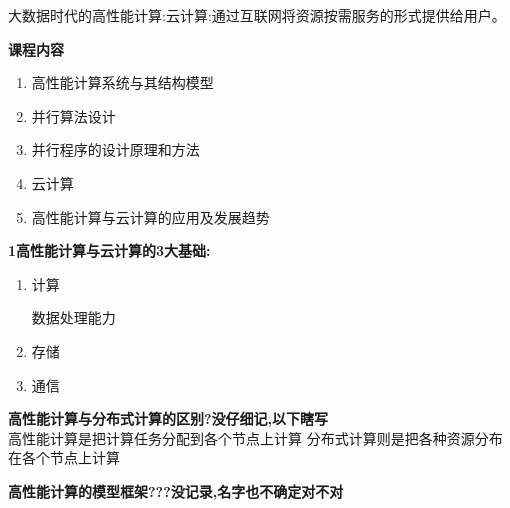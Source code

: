 \documentclass[UTF8,a4paper]{ctexart}
\newcommand{\spaceline}{\vspace{\baselineskip}}
\begin{document}
  大数据时代的高性能计算:云计算:通过互联网将资源按需服务的形式提供给用户。

  \spaceline
  \textbf{课程内容}
  \begin{enumerate}
    \item 高性能计算系统与其结构模型
    \item 并行算法设计
    \item 并行程序的设计原理和方法
    \item 云计算
    \item 高性能计算与云计算的应用及发展趋势
  \end{enumerate}

  \spaceline
  \textbf{1高性能计算与云计算的3大基础:}
  \begin{enumerate}
    \item 计算

    数据处理能力

    \item 存储

    \item 通信
  \end{enumerate}

  \spaceline
  \textbf{高性能计算与分布式计算的区别?没仔细记,以下瞎写}\\
  高性能计算是把计算任务分配到各个节点上计算
  分布式计算则是把各种资源分布在各个节点上计算

  \spaceline
  \textbf{高性能计算的模型框架???没记录,名字也不确定对不对}
\end{document}
